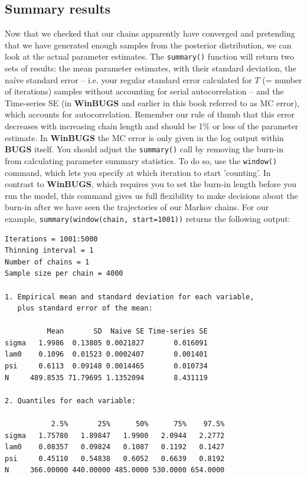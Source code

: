 \subsection{Summary results}
Now that we checked that our chains apparently have converged and pretending 
that we have generated enough samples from the posterior distribution, we 
can look at the actual parameter estimates. The \verb#summary()# function 
will return two sets of results: the mean parameter estimates, with their standard deviation, the na\'{i}ve standard error -- i.e. your regular standard error calculated for $T$ (= number of iterations) 
samples without 
accounting for serial autocorrelation -- and the 
Time-series SE (in {\bf WinBUGS} 
and earlier in this book referred to as MC error), which accounts for 
autocorrelation. Remember our rule of thumb that this error 
decreases with increasing chain length and should be 1\% or less of the 
parameter estimate. In {\bf WinBUGS} the MC error is only given in the log 
output within {\bf BUGS} itself.
You should adjust the \verb#summary()# call by removing the burn-in from
calculating parameter summary statistics. To do so, use the \verb#window()#
command, which lets you specify at which iteration to start
'counting'. In contrast to {\bf WinBUGS}, which requires you to set the
burn-in length before you run the model, this command gives us full
flexibility to make decisions about the burn-in after we have seen the
trajectories of our Markov chains. For our example,
\verb#summary(window(chain, start=1001))# returns the following output:


\begin{verbatim}
Iterations = 1001:5000
Thinning interval = 1
Number of chains = 1
Sample size per chain = 4000

1. Empirical mean and standard deviation for each variable,
   plus standard error of the mean:

          Mean       SD  Naive SE Time-series SE
sigma   1.9986  0.13805 0.0021827       0.016091
lam0    0.1096  0.01523 0.0002407       0.001401
psi     0.6113  0.09148 0.0014465       0.010734
N     489.8535 71.79695 1.1352094       8.431119

2. Quantiles for each variable:

           2.5%       25%      50%      75%    97.5%
sigma   1.75780   1.89847   1.9900   2.0944   2.2772
lam0    0.08357   0.09824   0.1087   0.1192   0.1427
psi     0.45110   0.54838   0.6052   0.6639   0.8192
N     366.00000 440.00000 485.0000 530.0000 654.0000
\end{verbatim}


